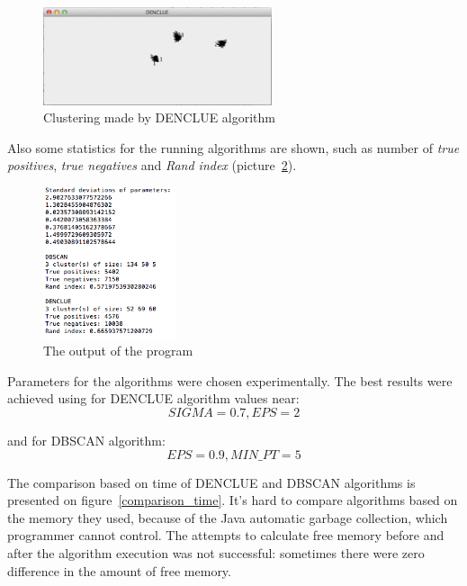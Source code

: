 \documentclass[12pt, a4paper, notitlepage, oneside]{article}
\begin{document}
\begin{figure}[!ht]
 	\centering
	\includegraphics[width=0.6\textwidth]{images/denclue.png}
 	\caption[]
	{Clustering made by DENCLUE algorithm}
		\label{denclue}
	\end{figure}

Also some statistics for the running algorithms are shown, such as number of \textit{true positives}, \textit{true negatives} and \textit{Rand index} (picture~\ref{result}).

\begin{figure}[!ht]
 	\centering
	\includegraphics[width=0.35\textwidth]{images/results.png}
 	\caption[]
	{The output of the program}
		\label{result}
\end{figure}

Parameters for the algorithms were chosen experimentally. The best results were achieved using for DENCLUE  algorithm values near: 
$$SIGMA = 0.7, EPS = 2$$

and for DBSCAN algorithm:
$$EPS = 0.9, MIN\_PT = 5$$

The comparison based on time of DENCLUE and DBSCAN algorithms is presented on figure~\ref{comparison_time}. It's hard to compare algorithms based on the memory they used, because of the Java automatic garbage collection, which programmer cannot control. The attempts to calculate free memory before and after the algorithm execution was not successful: sometimes there were zero difference in the amount of free memory. 
\end{document}
